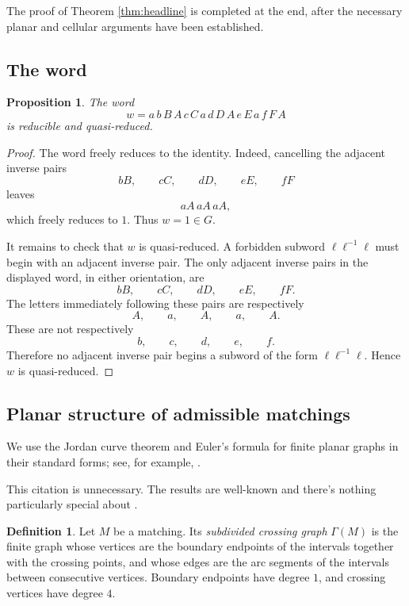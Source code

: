 \documentclass[12pt]{article}
\newtheorem{proposition}[theorem]{Proposition}
\theoremstyle{definition}
\newtheorem{definition}[theorem]{Definition}
\newcommand{\review}[1]{\begin{reviewbox}#1\end{reviewbox}}
\begin{document}
The proof of Theorem \ref{thm:headline} is completed at the end, after the necessary planar and cellular arguments have been established.

\subsection{The word}

\begin{proposition}\label{prop:word}
The word
\[
w=a\,b\,B\,A\,c\,C\,a\,d\,D\,A\,e\,E\,a\,f\,F\,A
\]
is reducible and quasi-reduced.
\end{proposition}

\begin{proof}
The word freely reduces to the identity.  Indeed, cancelling the adjacent inverse pairs
\[
bB,\qquad cC,\qquad dD,\qquad eE,\qquad fF
\]
leaves
\[
aA\,aA\,aA,
\]
which freely reduces to \(1\).  Thus \(w=1\in G\).

It remains to check that \(w\) is quasi-reduced.  A forbidden subword \(\ell\ell^{-1}\ell\) must begin with an adjacent inverse pair.  The only adjacent inverse pairs in the displayed word, in either orientation, are
\[
bB,\qquad cC,\qquad dD,\qquad eE,\qquad fF.
\]
The letters immediately following these pairs are respectively
\[
A,\qquad a,\qquad A,\qquad a,\qquad A.
\]
These are not respectively
\[
b,\qquad c,\qquad d,\qquad e,\qquad f.
\]
Therefore no adjacent inverse pair begins a subword of the form \(\ell\ell^{-1}\ell\).  Hence \(w\) is quasi-reduced.
\end{proof}

\subsection{Planar structure of admissible matchings}

We use the Jordan curve theorem and Euler's formula for finite planar graphs in their standard forms; see, for example, \cite{Munkres}.
\review{This citation is unnecessary. The results are well-known and there's nothing particularly special about \cite{Munkres}.}

\begin{definition}
Let \(M\) be a matching.  Its \emph{subdivided crossing graph} \(\Gamma(M)\) is the finite graph whose vertices are the boundary endpoints of the intervals together with the crossing points, and whose edges are the arc segments of the intervals between consecutive vertices.  Boundary endpoints have degree \(1\), and crossing vertices have degree \(4\).
\end{definition}
\end{document}
